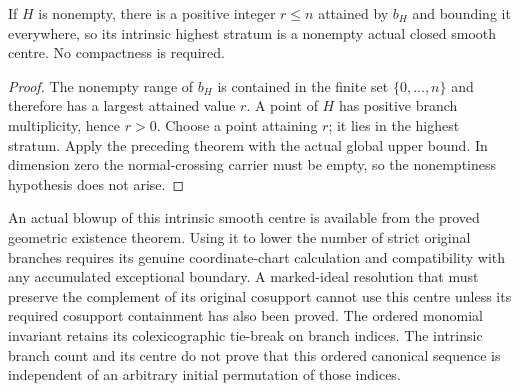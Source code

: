 \begin{corollary}
\label{hir:general-nc-actual-highest-stratum-exists}
\leanok
If $H$ is nonempty, there is a positive integer $r\le n$ attained
by $b_H$ and bounding it everywhere, so its intrinsic highest
stratum is a nonempty actual closed smooth centre. No compactness
is required.
\end{corollary}
\begin{proof}
The nonempty range of $b_H$ is contained in the finite set
$\{0,\ldots,n\}$ and therefore has a largest attained value $r$.
A point of $H$ has positive branch multiplicity, hence $r>0$.
Choose a point attaining $r$; it lies in the highest stratum.
Apply the preceding theorem with the actual global upper bound.
In dimension zero the normal-crossing carrier must be empty, so
the nonemptiness hypothesis does not arise.
\end{proof}

\begin{remark}
An actual blowup of this intrinsic smooth centre is available from
the proved geometric existence theorem. Using it to lower the number
of strict original branches requires its genuine coordinate-chart
calculation and compatibility with any accumulated exceptional
boundary. A marked-ideal resolution that must preserve the complement
of its original cosupport cannot use this centre unless its required
cosupport containment has also been proved.
The ordered monomial invariant retains its colexicographic tie-break
on branch indices. The intrinsic branch count and its centre do not
prove that this ordered canonical sequence is independent of an
arbitrary initial permutation of those indices.
\end{remark}
